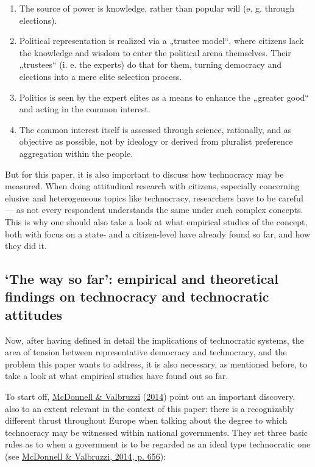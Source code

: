 \documentclass[
  12pt,
  english,
]{article}
\begin{document}
\begin{enumerate}
\def\labelenumi{\arabic{enumi}.}
\item
  The source of power is knowledge, rather than popular will (e. g.
  through elections).
\item
  Political representation is realized via a „trustee model``, where
  citizens lack the knowledge and wisdom to enter the political arena
  themselves. Their „trustees`` (i. e. the experts) do that for them,
  turning democracy and elections into a mere elite selection process.
\item
  Politics is seen by the expert elites as a means to enhance the
  „greater good`` and acting in the common interest.
\item
  The common interest itself is assessed through science, rationally,
  and as objective as possible, not by ideology or derived from
  pluralist preference aggregation within the people.
\end{enumerate}

But for this paper, it is also important to discuss how technocracy may
be measured. When doing attitudinal research with citizens, especially
concerning elusive and heterogeneous topics like technocracy,
researchers have to be careful --- as not every respondent understands
the same under such complex concepts. This is why one should also take a
look at what empirical studies of the concept, both with focus on a
state- and a citizen-level have already found so far, and how they did
it.

\newpage{}

\hypertarget{the-way-so-far-empirical-and-theoretical-findings-on-technocracy-and-technocratic-attitudes}{%
\subsection{`The way so far': empirical and theoretical findings on
technocracy and technocratic
attitudes}\label{the-way-so-far-empirical-and-theoretical-findings-on-technocracy-and-technocratic-attitudes}}

Now, after having defined in detail the implications of technocratic
systems, the area of tension between representative democracy and
technocracy, and the problem this paper wants to address, it is also
necessary, as mentioned before, to take a look at what empirical studies
have found out so far.

To start off, \protect\hyperlink{ref-mcdonnell2014defining}{McDonnell \&
Valbruzzi} (\protect\hyperlink{ref-mcdonnell2014defining}{2014}) point
out an important discovery, also to an extent relevant in the context of
this paper: there is a recognizably different thrust throughout Europe
when talking about the degree to which technocracy may be witnessed
within national governments. They set three basic rules as to when a
government is to be regarded as an ideal type technocratic one (see
\protect\hyperlink{ref-mcdonnell2014defining}{McDonnell \& Valbruzzi,
2014, p. 656}):
\end{document}
